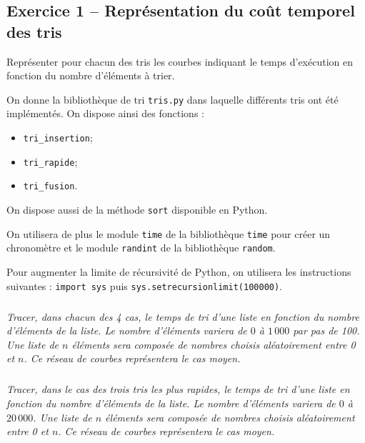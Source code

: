 \documentclass[10pt,fleqn]{article} %
\begin{document}
\def\espacebandeautitre{0cm}

\vspace{5cm}
\pagestyle{fancy}
\thispagestyle{plain}


\def\columnseprulecolor{\color{ocre}}
\setlength{\columnseprule}{0.4pt} 




\begin{multicols}{2}

\section*{Exercice 1 -- Représentation du coût temporel des tris}

\begin{obj}
Représenter pour chacun des tris les courbes indiquant le temps d'exécution en fonction du nombre d'éléments à trier.
\end{obj}
On donne la bibliothèque de tri \texttt{tris.py} dans laquelle différents tris ont été implémentés.
On dispose ainsi des fonctions : 
\begin{itemize}
\item \texttt{tri\_insertion};
\item \texttt{tri\_rapide};
\item \texttt{tri\_fusion}.
\end{itemize}
On dispose aussi de la méthode \texttt{sort} disponible en Python.

On utilisera de plus le module \texttt{time} de la bibliothèque \texttt{time} pour créer un chronomètre et le module \texttt{randint} de la bibliothèque \texttt{random}.

Pour augmenter la limite de récursivité de Python, on utilisera les instructions suivantes : \texttt{import sys} puis \texttt{sys.setrecursionlimit(100000)}.

\subparagraph{}
\textit{Tracer, dans chacun des 4 cas, le temps de tri d'une liste en fonction du nombre d'éléments de la liste. Le nombre d'éléments variera de $0$ à $1\, 000$ par pas de 100. Une liste de $n$ éléments sera composée de nombres choisis aléatoirement entre 0 et $n$. Ce réseau de courbes représentera le cas moyen.}

\subparagraph{}
\textit{Tracer, dans le cas des trois tris les plus rapides, le temps de tri d'une liste en fonction du nombre d'éléments de la liste. Le nombre d'éléments variera de $0$ à $20\, 000$. Une liste de $n$ éléments sera composée de nombres choisis aléatoirement entre 0 et $n$. Ce réseau de courbes représentera le cas moyen.}


\end{multicols}
\end{document}
